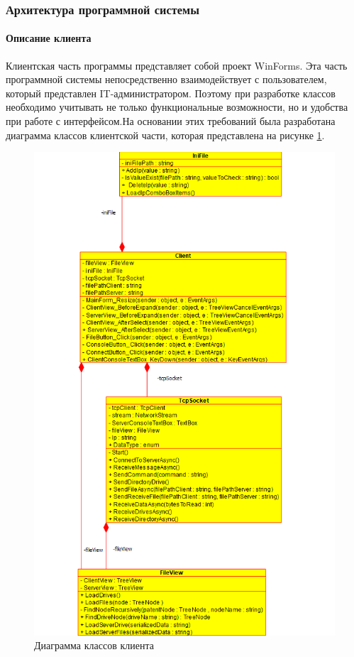 \subsubsection{Архитектура программной системы}
\paragraph{Описание клиента}
Клиентская часть программы представляет собой проект WinForms. Эта часть программной системы непосредственно взаимодействует с пользователем, который представлен IT-администратором. Поэтому при разработке классов необходимо учитывать не только функциональные возможности, но и удобства при работе с интерфейсом.На основании этих требований была разработана диаграмма классов клиентской части, которая представлена на рисунке \ref{fig:-class-diagrama-client}.
\begin{figure}
	\centering
	\includegraphics[width=0.95\linewidth]{"images/Диаграмма клиента"}
	\caption{Диаграмма классов клиента}
	\label{fig:-class-diagrama-client}
\end{figure}


